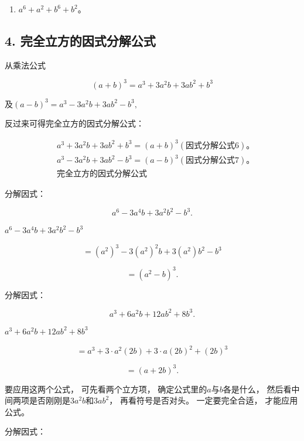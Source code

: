 \begin{enumerate}[start=10]
\item
  \(a^6 + a^2 + b^6 + b^2\)。
\end{enumerate}

\subsection{4. 完全立方的因式分解公式}

从乘法公式

\[
(a + b) ^{3} = a ^{3} + 3 a ^{2} b + 3 a b ^{2} + b ^{3}
\]

及\((a - b)^3 = a^3 - 3a^2b + 3ab^2 - b^3,\)

反过来可得完全立方的因式分解公式：

\[
\begin{array}{rl} & a ^{3} + 3 a ^{2} b + 3 a b ^{2} + b ^{3} = (a + b) ^{3} (\text{因式分解公式6})\text{。} \\ & a ^{3} - 3 a ^{2} b + 3 a b ^{2} - b ^{3} = (a - b) ^{3} (\text{因式分解公式7})\text{。} \\ & \text{完全立方的因式分解公式} \end{array}
\]

 分解因式：

\[
a ^{6} - 3 a ^{4} b + 3 a ^{2} b ^{2} - b ^{3}.
\]

\(a^6 - 3a^4b + 3a^2b^2 - b^3\)

\[
= (a ^{2}) ^{3} - 3 (a ^{2}) ^{2} b + 3 (a ^{2}) b ^{2} - b ^{3}
\]

\[
= (a ^{2} - b) ^{3}.
\]

 分解因式：

\[
a ^{3} + 6 a ^{2} b + 12 a b ^{2} + 8 b ^{3}.
\]

\(a^3 + 6a^2b + 12ab^2 + 8b^3\)

\[
= a ^{3} + 3 \cdot a ^{2} (2 b) + 3 \cdot a (2 b) ^{2} + (2 b) ^{3}
\]

\[
= (a + 2 b) ^{3}.
\]

 要应用这两个公式， 可先看两个立方项，
确定公式里的\(a\)与\(b\)各是什么，
然后看中间两项是否刚刚是\(3a^{2}b\)和\(3ab^{2}\)， 再看符号是否对头。
一定要完全合适， 才能应用公式。

分解因式：


